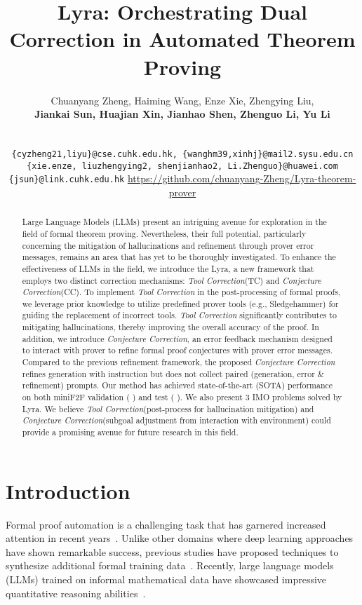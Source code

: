\documentclass{article} \usepackage{iclr2024_conference,times}
\title{Lyra: Orchestrating Dual Correction in Automated Theorem Proving}
\author{Chuanyang Zheng,\space\space\space
  Haiming Wang,\space\space\space
  Enze Xie,\space\space\space
  Zhengying Liu,\space\space\space
\\ \vspace{0.15cm}
  \textbf{Jiankai Sun,\space\space\space
  Huajian Xin,\space\space\space
  Jianhao Shen,\space\space\space
  Zhenguo Li,\space\space\space
  Yu Li\space\space\space
  }
  \\
  \normalfont{The Chinese University of Hong Kong}\quad
  \normalfont{Sun Yat-sen University}\quad\\
  \normalfont{Huawei Noah’s Ark Lab}\quad
\vspace{0.15cm} \\
  {\tt\small \{cyzheng21,liyu\}@cse.cuhk.edu.hk,
  \{wanghm39,xinhj\}@mail2.sysu.edu.cn}\\
  {\tt\small\{xie.enze, liuzhengying2, shenjianhao2, Li.Zhenguo\}@huawei.com}\\
  {\tt\small\{jsun\}@link.cuhk.edu.hk}
  \AND
  \quad\quad\space\space\space\url{https://github.com/chuanyang-Zheng/Lyra-theorem-prover}
}
\def\methodOne{TC\xspace}
\def\methodOneFull{\textit{Tool Correction}\xspace}
\def\methodTwo{CC\xspace}
\def\methodTwoFull{\textit{Conjecture Correction}\xspace}
\def\fullname{Lyra\xspace}
\begin{document}
\maketitle

\begin{abstract}
Large Language Models (LLMs) present an intriguing avenue for exploration in the field of formal theorem proving. Nevertheless, their full potential, particularly concerning the mitigation of hallucinations and refinement through prover error messages, remains an area that has yet to be thoroughly investigated. To enhance the effectiveness of LLMs in the field, we introduce the \fullname, a new framework that employs two distinct correction mechanisms: \methodOneFull (\methodOne) and \methodTwoFull (\methodTwo).
To implement \methodOneFull in the post-processing of formal proofs, we leverage prior knowledge to utilize predefined prover tools (e.g., Sledgehammer) for guiding the replacement of incorrect tools. \methodOneFull significantly contributes to mitigating hallucinations, thereby improving the overall accuracy of the proof. 
In addition, we introduce \methodTwoFull, an error feedback mechanism designed to interact with prover to refine formal proof conjectures with prover error messages. Compared to the previous refinement framework, the proposed \methodTwoFull refines generation with instruction but does not collect paired (generation, error \& refinement) prompts.
Our method has
achieved state-of-the-art (SOTA) performance on both miniF2F validation (  ) and test (  ). 
We also present 3 IMO problems solved by \fullname.
We believe \methodOneFull (post-process for hallucination mitigation) and \methodTwoFull (subgoal adjustment from interaction with environment) could provide a promising avenue for future research in this field.
\end{abstract}

\section{Introduction}
Formal proof automation is a challenging task that has garnered increased attention in recent years~\citep{bansal2019holist,polu2020generative,lample2022hypertree,jiang2022thor,wu2022autoformalization, wang2023dt}. Unlike other domains where deep learning approaches have shown remarkable success, previous studies have proposed techniques to synthesize additional formal training data~\citep{wu2022autoformalization,polu2020generative,han2021proof, bansal2019learning,polu2023formal}. Recently, large language models (LLMs) trained on informal mathematical data have showcased impressive quantitative reasoning abilities~\citep{lewkowycz2022solving, welleck2022naturalprover}. 
\end{document}
